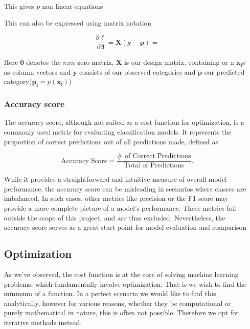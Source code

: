 \documentclass{article}
\theoremstyle{definition}
\begin{document}
This gives $p$ non linear equations

This can also be expressed using matrix notation

\[
\frac{\partial \ell }{\partial \boldsymbol{\beta}}  = \boldsymbol{X} (\boldsymbol{y} - \boldsymbol{p}) = 
\]

Here $\boldsymbol{0}$ denotes the $nxn$ zero matrix, $\mathbf{X}$ is our design matrix, containing or n $\boldsymbol{x_i}$s as column vectors and $\boldsymbol{y}$ consists of our observed categories and $\boldsymbol{p}$ our predicted category($\boldsymbol{p_i} = p(\boldsymbol{x_i})$)





\subsubsection{Accuracy score}

The accuracy score, although not suited as a cost function for optimization, is a commonly used metric for evaluating classification models. It represents the proportion of correct predictions out of all predictions made, defined as

\begin{equation*}
    \text{Accuracy Score} = \frac{ \# \text{ of Correct Predictions}}{\text{Total} \text{ of Predictions}}.
\end{equation*}

While it provides a straightforward and intuitive measure of overall model performance, the accuracy score can be misleading in scenarios where classes are imbalanced. In such cases, other metrics like precision or the F1 score may provide a more complete picture of a model's performance. These metrics fall outside the scope of this project, and are thus excluded. Nevertheless, the accuracy score serves as a great start point for model evaluation and comparison

\subsection{Optimization}
As we've observed, the cost function is at the core of solving machine learning problems, which fundamentally involve optimization. That is we wish to find the minimum of a function. In a perfect scenario we would like to find this analytically, however for various reasons, whether they be computational or purely mathematical in nature, this is often not possible. Therefore we opt for iterative methods instead.
\end{document}
